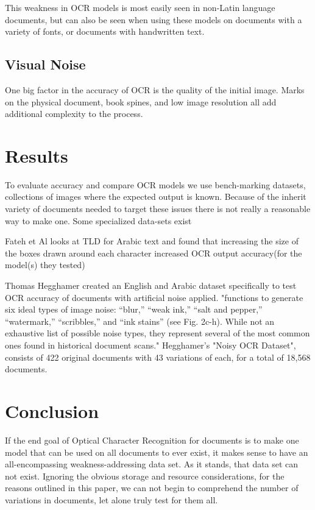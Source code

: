 \documentclass[sigplan,screen,nonacm]{acmart-tagged}
\begin{document}
This weakness in OCR models is most easily seen in non-Latin language documents, but can also be seen when using these models on documents with a variety of fonts, or documents with handwritten text. 

\subsection{Visual Noise}
\label{Noise}

One big factor in the accuracy of OCR is the quality of the initial image. Marks on the physical document, book spines, and low image resolution all add additional complexity to the process. 



\section{Results}
\label{sec:Results}

To evaluate accuracy and compare OCR models we use bench-marking datasets, collections of images where the expected output is known. Because of the inherit variety of documents needed to target these issues there is not really a reasonable way to make one. Some specialized data-sets exist \cite{Fateh:2024,Hegghamer:2022}

Fateh et Al\citep{Fateh:2024} looks at TLD for Arabic text and found that increasing the size of the boxes drawn around each character increased OCR output accuracy(for the model(s) they tested)

Thomas Hegghamer created an English and Arabic dataset specifically to test OCR accuracy of documents with artificial noise applied. "functions to generate six ideal types of image noise: “blur,” “weak ink,” “salt and pepper,” “watermark,” “scribbles,” and “ink stains” (see Fig. 2c-h). While not an exhaustive list of possible noise types, they represent several of the most common ones found in historical document scans."\citep{Hegghamer:2022} Hegghamer's "Noisy OCR Dataset", consists of 422 original documents with 43 variations of each, for a total of 18,568 documents.

\section{Conclusion}
\label{Conclusion}

If the end goal of Optical Character Recognition for documents is to make one model that can be used on all documents to ever exist, it makes sense to have an all-encompassing weakness-addressing data set. As it stands, that data set can not exist. Ignoring the obvious storage and resource considerations, for the reasons outlined in this paper, we can not begin to comprehend the number of variations in documents, let alone truly test for them all. 
\end{document}

